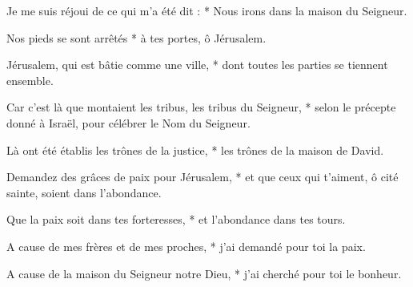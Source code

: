 \item Je me suis réjoui de ce qui m'a été dit : * Nous irons dans la maison du Seigneur.
\item Nos pieds se sont arrêtés * à tes portes, ô Jérusalem.
\item Jérusalem, qui est bâtie comme une ville, * dont toutes les parties se tiennent ensemble.
\item Car c'est là que montaient les tribus, les tribus du Seigneur, * selon le précepte donné à Israël, pour célébrer le Nom du Seigneur.
\item Là ont été établis les trônes de la justice, * les trônes de la maison de David.
\item Demandez des grâces de paix pour Jérusalem, * et que ceux qui t'aiment, ô cité sainte, soient dans l'abondance.
\item Que la paix soit dans tes forteresses, * et l'abondance dans tes tours.
\item A cause de mes frères et de mes proches, * j'ai demandé pour toi la paix.
\item A cause de la maison du Seigneur notre Dieu, * j'ai cherché pour toi le bonheur.